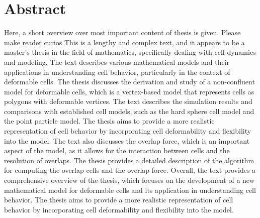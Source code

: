 \section*{Abstract}

Here, a short overview over most important content of thesis is given. Please make reader curios
This is a lengthy and complex text, and it appears to be a master's thesis in the field of mathematics, specifically dealing with cell dynamics and modeling. The text describes various mathematical models and their applications in understanding cell behavior, particularly in the context of deformable cells. The thesis discusses the derivation and study of a non-confluent model for deformable cells, which is a vertex-based model that represents cells as polygons with deformable vertices.
The text describes the simulation results and comparisons with established cell models, such as the hard sphere cell model and the point particle model. The thesis aims to provide a more realistic representation of cell behavior by incorporating cell deformability and flexibility into the model.
The text also discusses the overlap force, which is an important aspect of the model, as it allows for the interaction between cells and the resolution of overlaps. The thesis provides a detailed description of the algorithm for computing the overlap cells and the overlap force.
Overall, the text provides a comprehensive overview of the thesis, which focuses on the development of a new mathematical model for deformable cells and its application in understanding cell behavior. The thesis aims to provide a more realistic representation of cell behavior by incorporating cell deformability and flexibility into the model. 